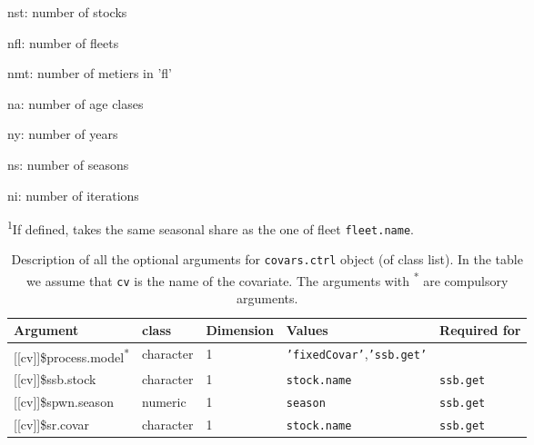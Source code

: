 \begin{landscape}
\begin{table}[!ht]
\begin{footnotesize}
\begin{threeparttable}
      \begin{tablenotes}
        \item nst: number of stocks
        \item nfl: number of fleets
        \item nmt: number of metiers in 'fl'
        \item na: number of age clases
        \item ny: number of years
        \item ns: number of seasons
        \item ni: number of iterations
        \item \textsuperscript{1}If defined, takes the same seasonal share as the one of fleet \texttt{fleet.name}.
      \end{tablenotes}
      
    \end{threeparttable}
  \end{footnotesize}

\end{table}	


\begin{table}[!ht]

  \centering
  \begin{footnotesize}

    \caption{Description of all the optional arguments for \texttt{covars.ctrl} object (of class list).
    In the table we assume that \texttt{cv} is the name of the covariate.
    The arguments with \textsuperscript{*} are compulsory arguments.}
    
    \label{tb:A3.table4}

    \begin{threeparttable}

      \begin{tabular}{lllll} %
        \hline
        Argument & class & Dimension & Values & Required for \\
        \hline
        {[[cv]]}\$process.model\textsuperscript{*} & character & 1 & \texttt{'fixedCovar'},\texttt{'ssb.get'}  &	\\
        {[[cv]]}\$ssb.stock & character & 1 & \texttt{stock.name} &	\texttt{ssb.get} \\
        {[[cv]]}\$spwn.season & numeric & 1 & \texttt{season} &	\texttt{ssb.get} \\
        {[[cv]]}\$sr.covar & character & 1 & \texttt{stock.name} &	\texttt{ssb.get} \\
        \hline
      \end{tabular}


\end{threeparttable}
\end{footnotesize}
\end{table}
\end{landscape}
